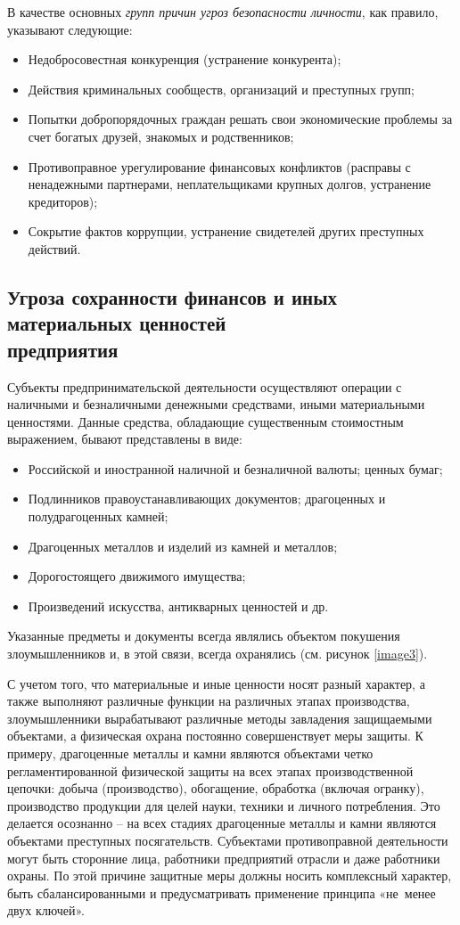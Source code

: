\documentclass[a4paper,12pt,fleqn]{article} %
\begin{document}
В качестве основных \textit{групп причин угроз безопасности личности}, как правило, указывают следующие:
\begin{itemize}
	\item Недобросовестная конкуренция (устранение конкурента);
	\item Действия криминальных сообществ, организаций и преступных групп; 
	\item Попытки добропорядочных граждан решать свои экономические проблемы за счет богатых друзей, знакомых и родственников;
	\item Противоправное урегулирование финансовых конфликтов (расправы с ненадежными партнерами, неплательщиками крупных долгов, устранение кредиторов);
	\item Сокрытие фактов коррупции, устранение свидетелей других преступных действий.
\end{itemize}

\subsection{Угроза сохранности финансов и иных материальных ценностей \\предприятия}

Субъекты предпринимательской деятельности осуществляют операции с наличными и безналичными денежными средствами, иными материальными ценностями. Данные средства, обладающие существенным стоимостным выражением, бывают представлены в виде: 
\begin{itemize}
	\item Российской и иностранной наличной и безналичной валюты; ценных бумаг; 
	\item Подлинников правоустанавливающих документов; драгоценных и полудрагоценных камней;
	\item Драгоценных металлов и изделий из камней и металлов;
	\item Дорогостоящего движимого имущества; 
	\item Произведений искусства, антикварных ценностей и др. 
\end{itemize}
	
Указанные предметы и документы всегда являлись объектом покушения злоумышленников и, в этой связи, всегда охранялись (см. рисунок \ref{image3}).

С учетом того, что материальные и иные ценности носят разный характер, а также выполняют различные функции на различных этапах производства, злоумышленники вырабатывают различные методы завладения защищаемыми объектами, а физическая охрана постоянно совершенствует меры защиты. К примеру, драгоценные металлы и камни являются объектами четко регламентированной физической защиты на всех этапах производственной цепочки: добыча (производство), обогащение, обработка (включая огранку), производство продукции для целей науки, техники и личного потребления. Это делается осознанно – на всех стадиях драгоценные металлы и камни являются объектами преступных посягательств. Субъектами противоправной деятельности могут быть сторонние лица, работники предприятий отрасли и даже работники охраны. По этой причине защитные меры должны носить комплексный характер, быть сбалансированными и предусматривать применение принципа «не~менее двух ключей».
\end{document}
